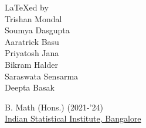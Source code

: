 \documentclass[../Analysis-3.tex]{subfiles}
\begin{document}
\newpage
\thispagestyle{plain}

\phantom{.}

\vfill

\sffamily
{\LARGE {\rm\LaTeX}ed by} \\[0.5cm]

\large
Trishan Mondal \\
Soumya Dasgupta \\
Aaratrick Basu \\
Priyatosh Jana \\
Bikram Halder \\
Saraswata Sensarma \\
Deepta Basak

\vspace{0.5cm}

B. Math (Hons.) (2021-'24) \\
\href{https://www.isibang.ac.in}{Indian Statistical Institute, Bangalore}
\end{document}
